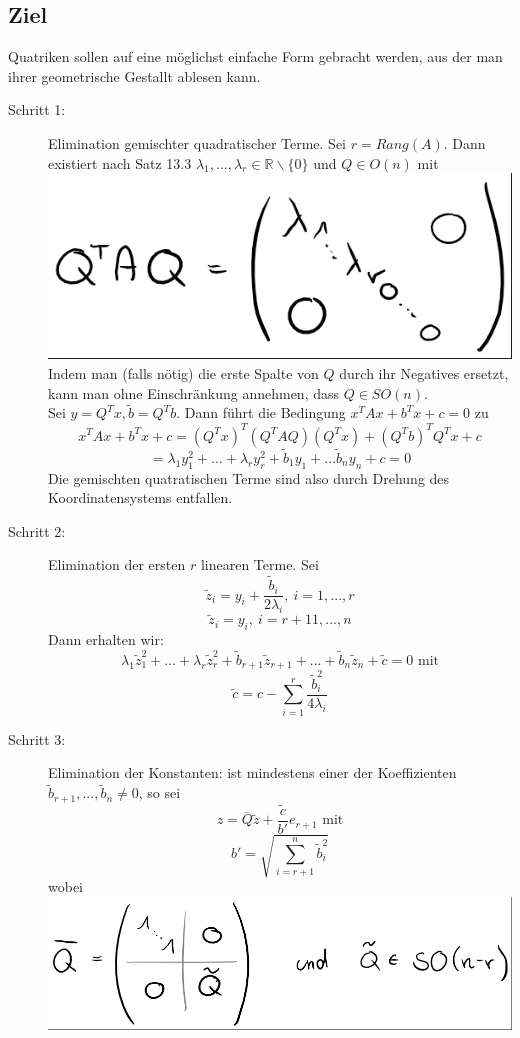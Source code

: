 \documentclass{scrbook}
\begin{document}
\subsection*{Ziel}
Quatriken sollen auf eine möglichst einfache Form gebracht werden, aus der man ihrer geometrische Gestallt ablesen kann.
\begin{description}
\item[Schritt 1:] Elimination gemischter quadratischer Terme. Sei $r = Rang(A)$. Dann existiert nach Satz 13.3 $\lambda_1,...,\lambda_r \in \mathbb{R} \backslash \{0\}$ und $Q \in O(n)$ mit
\\
\includegraphics{Ziel_15_1_1.png}
\\
Indem man (falls nötig) die erste Spalte von $Q$ durch ihr Negatives ersetzt, kann man ohne Einschränkung annehmen, dass $Q \in SO(n)$.\\
Sei $y = Q^Tx, \tilde{b} = Q^T b$. Dann führt die Bedingung $x^TAx+b^Tx+c = 0$ zu 
\[
x^T A x + b^T x +c = (Q ^Tx)^T(Q^TAQ)(Q^Tx) +(Q^Tb)^TQ^Tx+c
\]
\[= \lambda_1y_1^2+...+\lambda_ry_r^2 + \tilde{b}_1 y_1 + ... \tilde{b}_n y_n + c = 0\]
Die gemischten quatratischen Terme sind also durch Drehung des Koordinatensystems entfallen.
\item[Schritt 2:] Elimination der ersten $r$ linearen Terme. Sei 
\[\tilde{z}_i = y_i+ \frac{\tilde{b}_i}{2\lambda_i} ,\ i=1,...,r\]
\[\tilde{z}_i = y_i ,\ i=r+11,...,n\]
Dann erhalten wir:
\[
\lambda_1 \tilde{z}_1^2 + ... + \lambda_r \tilde{z}_r^2 + \tilde{b}_{r+1} \tilde{z}_{r+1}+...+ \tilde{b}_n \tilde{z}_n + \tilde{c} = 0 \text{ mit}
\]
\[\tilde{c} = c- \sum^r_{i=1} \frac{\tilde{b}_i^2}{4\lambda_i}\]
\item[Schritt 3:] Elimination der Konstanten: ist mindestens einer der Koeffizienten $\tilde{b}_{r+1},...,\tilde{b}_n \neq 0$, so sei
\[
z = \overline{Q} \tilde{z} + \frac{\tilde{c}}{b'}e_{r+1} \text{ mit}
\]
\[
b' = \sqrt{\sum^n_{i=r+1} \tilde{b}^2_i}
\] 
wobei\\
\includegraphics{Ziel_15_1_2.png}\\

\end{description}
\end{document}
